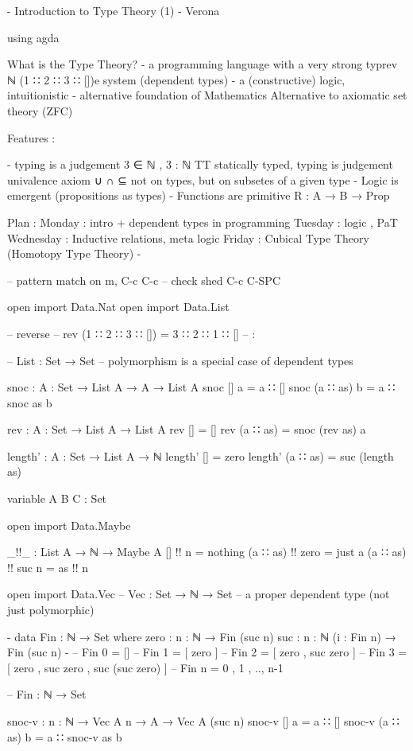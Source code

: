 {-
Introduction to Type Theory (1) - Verona

using agda

What is the Type Theory?
- a programming language
  with a very strong typrev {ℕ} (1 ∷ 2 ∷ 3 ∷ [])e system (dependent types)
- a (constructive) logic, intuitionistic
- alternative foundation of Mathematics 
  Alternative to axiomatic set theory (ZFC)

Features :

- typing is a judgement
3 ∈ ℕ   ,  3 : ℕ
TT statically typed, typing is judgement
univalence axiom
∪ ∩ ⊆ not on types, but on subsetes of a given type
- Logic is emergent (propositions as types)
- Functions are primitive 
  R : A → B → Prop


Plan :
Monday : intro + dependent types in programming
Tuesday : logic , PaT
Wednesday : Inductive relations, meta logic 
Friday : Cubical Type Theory (Homotopy Type Theory)
-}

-- pattern match on m, C-c C-c
-- check shed C-c C-SPC

open import Data.Nat
open import Data.List

-- reverse
-- rev (1 ∷ 2 ∷ 3 ∷ []) = 3 ∷ 2 ∷ 1 ∷ [] -- \::

-- List : Set → Set 
-- polymorphism is a special case of dependent types

snoc : {A : Set} → List A → A → List A
snoc [] a = a ∷ []
snoc (a ∷ as) b = a ∷ snoc as b

rev : {A : Set} → List A → List A
rev [] = []
rev (a ∷ as) = snoc (rev as) a

length' : {A : Set} → List A → ℕ
length' [] = zero
length' (a ∷ as) = suc (length as)

variable A B C : Set

open import Data.Maybe

_!!_ : List A → ℕ → Maybe A
[] !! n = nothing
(a ∷ as) !! zero = just a
(a ∷ as) !! suc n = as !! n

open import Data.Vec
-- Vec : Set → ℕ → Set
-- a proper dependent type (not just polymorphic)

{-
data Fin : ℕ → Set where
  zero : {n : ℕ} → Fin (suc n)
  suc  : {n : ℕ} (i : Fin n) → Fin (suc n)
-}
-- Fin 0 = []
-- Fin 1 = [ zero ]
-- Fin 2 = [ zero , suc zero ]
-- Fin 3 = [ zero , suc zero , suc (suc zero) ]
-- Fin n = { 0 , 1 , .., n-1 }

-- Fin : ℕ → Set

snoc-v : {n : ℕ} → Vec A n → A → Vec A (suc n)
snoc-v [] a = a ∷ []
snoc-v (a ∷ as) b = a ∷ snoc-v as b

